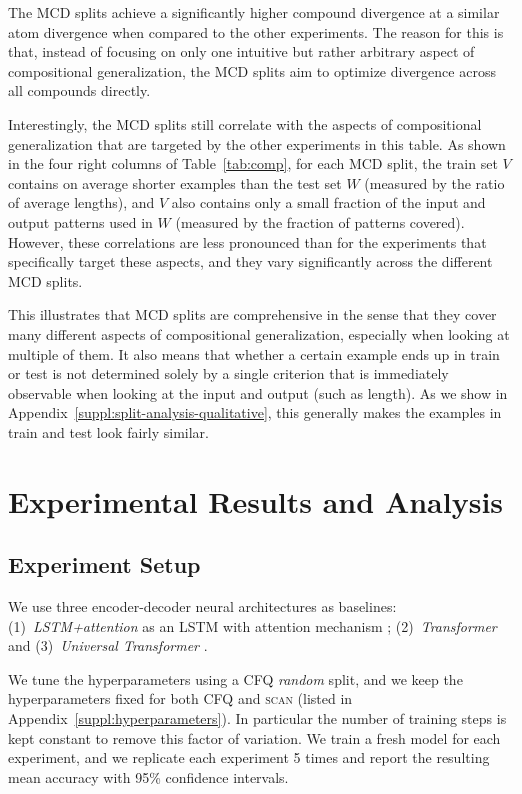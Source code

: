 \documentclass[letterpaper]{article}
\newcommand{\SCAN}{\textsc{scan}}
\begin{document}
The MCD splits achieve a significantly higher compound divergence at a similar atom divergence when compared to the other experiments.
The reason for this is that, instead of focusing on only one intuitive but rather arbitrary aspect of compositional generalization,
the MCD splits aim to optimize divergence across all compounds directly.

Interestingly, the MCD splits still correlate with the aspects of compositional generalization that are targeted by the other experiments in this table. As shown in the four right columns of Table~\ref{tab:comp}, for each MCD split, the train set $V$ contains on average shorter examples than the test set $W$ (measured by the ratio of average lengths), and $V$ also contains only a small fraction of the input and output patterns used in $W$ (measured by the fraction of patterns covered). However, these correlations are less pronounced than for the experiments that specifically target these aspects, and they vary significantly across the different MCD splits.

This illustrates that MCD splits are comprehensive in the sense that they cover many different aspects of compositional generalization, especially when looking at multiple of them. It also means that whether a certain example ends up in train or test is not determined solely by a single criterion that is immediately observable when looking at the input and output (such as length). As we show in Appendix~\ref{suppl:split-analysis-qualitative}, this generally makes the examples in train and test look fairly similar.

\section{Experimental Results and Analysis}
\label{sect:results-and-analysis}

\subsection{Experiment Setup}

We use three encoder-decoder neural architectures as baselines:
(1)~\textit{LSTM+attention} as an LSTM \citep{hochreiter1997long} with attention mechanism \citep{bahdanau-attention-iclr};
(2)~\textit{Transformer} \citep{vaswani2017attention} and 
(3)~\textit{Universal Transformer} \citep{dehghani2018universal}.

We tune the hyperparameters using a CFQ {\em random} split, and we keep the hyperparameters fixed for both CFQ and \SCAN{} (listed in Appendix~\ref{suppl:hyperparameters}). In particular the number of training steps is kept constant to remove this factor of variation.
We train a fresh model for each experiment,
and we replicate each experiment 5 times and report the resulting mean accuracy with 95\% confidence intervals.
\end{document}
